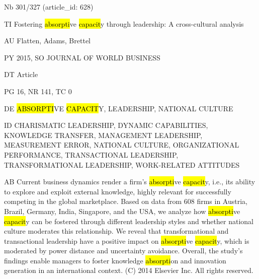 \documentclass[a4paper]{article}
\begin{document}
\vspace*{-2cm}
Nb \tabto{0cm}301/327 (article\_id: 628)\par
TI \tabto{0cm}Fostering \hl{absorpti}ve \hl{capacit}y through leadership: A cross-cultural analysis\par
AU \tabto{0cm}Flatten, Adams, Brettel\par
PY \tabto{0cm}2015, SO JOURNAL OF WORLD BUSINESS\par
DT \tabto{0cm}Article\par
PG \tabto{0cm}16, NR 141, TC 0\par
DE \tabto{0cm}\hl{ABSORPTI}VE \hl{CAPACIT}Y, LEADERSHIP, NATIONAL CULTURE\par
ID \tabto{0cm}CHARISMATIC LEADERSHIP, DYNAMIC CAPABILITIES, KNOWLEDGE TRANSFER, MANAGEMENT LEADERSHIP, MEASUREMENT ERROR, NATIONAL CULTURE, ORGANIZATIONAL PERFORMANCE, TRANSACTIONAL LEADERSHIP, TRANSFORMATIONAL LEADERSHIP, WORK-RELATED ATTITUDES\par
AB \tabto{0cm}Current business dynamics render a firm's \hl{absorpti}ve \hl{capacit}y, i.e., its ability to explore and exploit external knowledge, highly relevant for successfully competing in the global marketplace. Based on data from 608 firms in Austria, Brazil, Germany, India, Singapore, and the USA, we analyze how \hl{absorpti}ve \hl{capacit}y can be fostered through different leadership styles and whether national culture moderates this relationship. We reveal that transformational and transactional leadership have a positive impact on \hl{absorpti}ve \hl{capacit}y, which is moderated by power distance and uncertainty avoidance. Overall, the study's findings enable managers to foster knowledge \hl{absorpti}on and innovation generation in an international context. (C) 2014 Elsevier Inc. All rights reserved.\par
\clearpage
\end{document}
